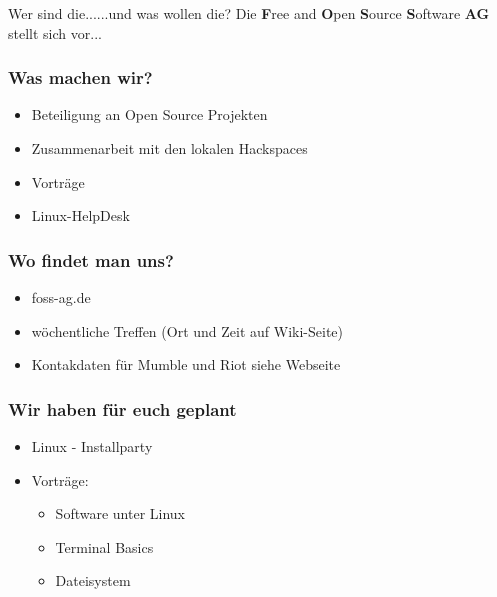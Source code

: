 \begin{frame}{Wer sind die...}{...und was wollen die?}
	Die \textbf{F}ree and \textbf{O}pen \textbf{S}ource \textbf{S}oftware \textbf{AG} stellt sich vor... 
\end{frame}

\begin{frame}
\frametitle{Was machen wir?}
\begin{itemize}
	\item Beteiligung an Open Source Projekten
	\item Zusammenarbeit mit den lokalen Hackspaces
	\item Vorträge
	\item Linux-HelpDesk
\end{itemize}
\end{frame}

\begin{frame}
\frametitle{Wo findet man uns?}
\begin{itemize}
	\item foss-ag.de
	\item wöchentliche Treffen (Ort und Zeit auf Wiki-Seite)
	\item Kontakdaten für Mumble und Riot siehe Webseite
\end{itemize}
\end{frame}

\begin{frame}
\frametitle{Wir haben für euch geplant}
\begin{itemize}
	\item Linux - Installparty
	\item Vorträge:
	\begin{itemize}
		\item Software unter Linux
		\item Terminal Basics
		\item Dateisystem
	\end{itemize}
\end{itemize}
\end{frame}

